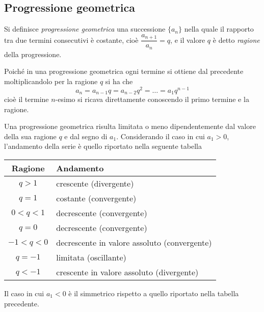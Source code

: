 \ovalbox{\ref{ese:8a_progr.13}, \ref{ese:8a_progr.14}, \ref{ese:8a_progr.15}, \ref{ese:8a_progr.16}, \ref{ese:8a_progr.17}, \ref{ese:8a_progr.18}, \ref{ese:8a_progr.19}, \ref{ese:8a_progr.20}, \ref{ese:8a_progr.21}}


\subsection{Progressione geometrica}

\begin{definizione}
Si definisce \emph{progressione geometrica} una successione $\{a_n\}$ nella quale il rapporto tra due termini consecutivi è costante, cioè $\dfrac{a_{n+1}}{a_n} = q$, e il valore $q$ è detto \emph{ragione} della progressione.
\end{definizione}

Poiché in una progressione geometrica ogni termine si ottiene dal precedente moltiplicandolo per la ragione $q$ si ha che
\[a_n = a_{n-1}q = a_{n-2}q^2 = \ldots = a_1 q^{n-1}\]
cioè il termine $n$-esimo si ricava direttamente conoscendo il primo termine e la ragione.

Una progressione geometrica risulta limitata o meno dipendentemente dal valore della sua ragione $q$ e dal segno di $a_1$. Considerando il caso in cui $a_1>0$, l'andamento della serie è quello riportato nella seguente tabella
\begin{center}
\begin{tabular}{cl}
\toprule
Ragione & Andamento\\
\midrule
$q>1$ & crescente (divergente)\\
$q=1$ & costante (convergente)\\
$0<q<1$ & decrescente (convergente)\\
$q=0$ & decrescente (convergente)\\
$-1<q<0$ & decrescente in valore assoluto (convergente)\\
$q=-1$ & limitata (oscillante)\\
$q<-1$ & crescente in valore assoluto (divergente)\\
\bottomrule
\end{tabular}
\end{center}
Il caso in cui $a_1<0$ è il simmetrico rispetto a quello riportato nella tabella precedente.

